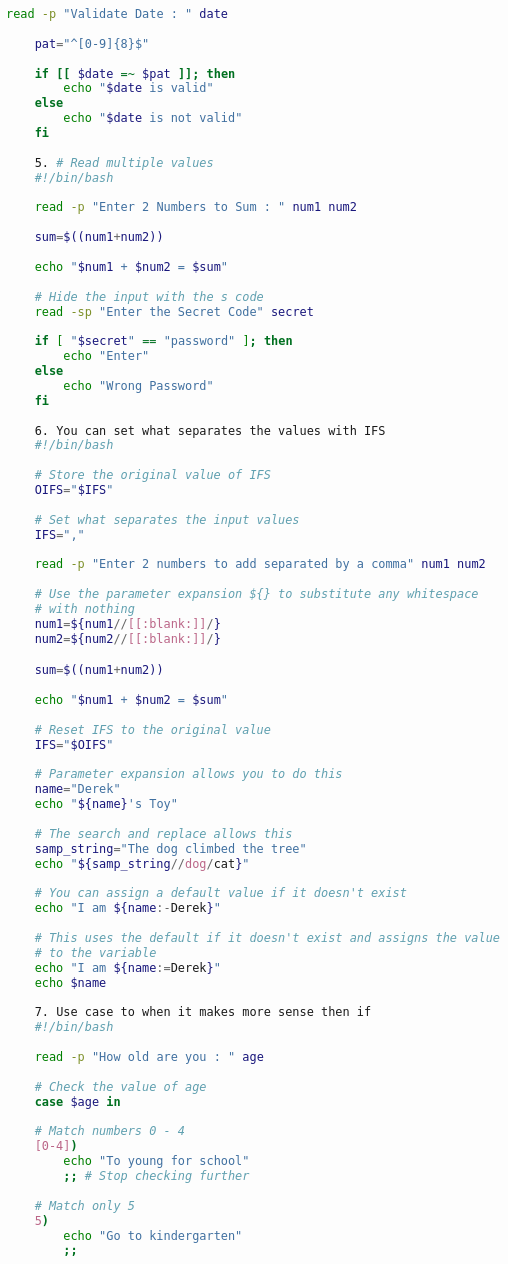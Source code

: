 \begin{lstlisting}[language=bash,caption={basics of bash}]
	read -p "Validate Date : " date
	
	pat="^[0-9]{8}$"
	
	if [[ $date =~ $pat ]]; then
		echo "$date is valid"
	else
		echo "$date is not valid"
	fi
	
	5. # Read multiple values
	#!/bin/bash
	
	read -p "Enter 2 Numbers to Sum : " num1 num2
	
	sum=$((num1+num2))
	
	echo "$num1 + $num2 = $sum"
	
	# Hide the input with the s code
	read -sp "Enter the Secret Code" secret
	
	if [ "$secret" == "password" ]; then
		echo "Enter"
	else
		echo "Wrong Password"
	fi
	
	6. You can set what separates the values with IFS
	#!/bin/bash
	
	# Store the original value of IFS
	OIFS="$IFS"
	
	# Set what separates the input values
	IFS=","
	
	read -p "Enter 2 numbers to add separated by a comma" num1 num2
	
	# Use the parameter expansion ${} to substitute any whitespace
	# with nothing
	num1=${num1//[[:blank:]]/}
	num2=${num2//[[:blank:]]/}

	sum=$((num1+num2))
	
	echo "$num1 + $num2 = $sum"
	
	# Reset IFS to the original value
	IFS="$OIFS"
	
	# Parameter expansion allows you to do this
	name="Derek"
	echo "${name}'s Toy"
	
	# The search and replace allows this
	samp_string="The dog climbed the tree"
	echo "${samp_string//dog/cat}"
	
	# You can assign a default value if it doesn't exist
	echo "I am ${name:-Derek}"
	
	# This uses the default if it doesn't exist and assigns the value
	# to the variable
	echo "I am ${name:=Derek}"
	echo $name
	
	7. Use case to when it makes more sense then if
	#!/bin/bash
	
	read -p "How old are you : " age
	
	# Check the value of age
	case $age in
	
	# Match numbers 0 - 4
	[0-4]) 
		echo "To young for school"
		;; # Stop checking further
		
	# Match only 5
	5)
		echo "Go to kindergarten"
		;;
		

\end{lstlisting}
